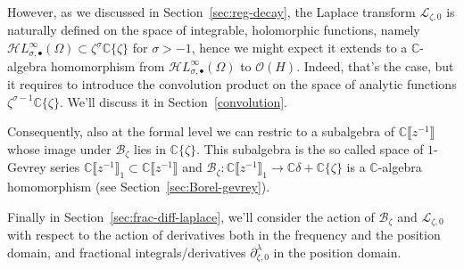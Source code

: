 \documentclass{article}
\newcommand{\singexp}[2]{\mathcal{H}L^\infty_{#1, #2}}
\newcommand{\singexpalg}[1]{\singexp{#1}{\bullet}}
\newcommand{\C}{\mathbb{C}}
\newcommand{\fracderiv}[3]{\partial^{#1}_{#2, #3}}
\newcommand{\laplace}{\mathcal{L}}
\newcommand{\borel}{\mathcal{B}}
\theoremstyle{definition}
\theoremstyle{plain}
\begin{document}
However, as we discussed in Section~\ref{sec:reg-decay}, the Laplace transform $\laplace_{\zeta,0}$ is naturally defined on the space of integrable, holomorphic functions, namely $\singexpalg{\sigma}(\Omega)\subset \zeta^{\sigma}\C\lbrace\zeta\rbrace$ for $\sigma>-1$, hence we might expect it extends to a $\C$-algebra homomorphism from $\singexpalg{\sigma}(\Omega)$ to $\mathcal{O}(H)$. Indeed, that's the case, but it requires to introduce the convolution product on the space of analytic functions $\zeta^{\sigma-1}\C\lbrace\zeta\rbrace$. We'll discuss it in Section~\ref{convolution}. 

Consequently, also at the formal level we can restric to a subalgebra of $\C\llbracket z^{-1}\rrbracket$ whose image under $\borel_\zeta$ lies in $\C\lbrace\zeta\rbrace$. This subalgebra is the so called space of $1$-Gevrey series $\C\llbracket z^{-1}\rrbracket_1\subset\C\llbracket z^{-1}\rrbracket$ and $\borel_\zeta\colon \C\llbracket z^{-1}\rrbracket_1\to\C\delta+\C\lbrace\zeta\rbrace$ is a $\C$-algebra homomorphism (see Section~\ref{sec:Borel-gevrey}). 

Finally in Section~\ref{sec:frac-diff-laplace}, we'll consider the action of $\borel_\zeta$ and $\laplace_{\zeta,0}$ with respect to the action of derivatives both in the frequency and the position domain, and fractional integrals/derivatives $\fracderiv{\lambda}{\zeta}{0}$ in the position domain. %
\end{document}
